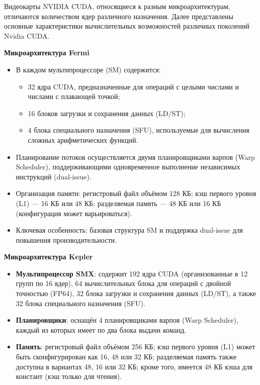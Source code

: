 \documentclass{article}[14pt]
\begin{document}
Видеокарты NVIDIA CUDA, относящиеся к разным микроархитектурам, отличаются количеством ядер различного назначения. 
Далее представлены основные характеристики вычислительных возможностей различных поколений Nvidia CUDA.

\noindent \textbf{Микроархитектура Fermi}

\begin{itemize}
\item В каждом мультипроцессоре (SM) содержится:
  \begin{itemize}
    \item 32 ядра CUDA, предназначенные для операций с целыми числами и числами с плавающей точкой;
    \item 16 блоков загрузки и сохранения данных (LD/ST);
    \item 4 блока специального назначения (SFU), используемые для вычисления сложных арифметических функций.
  \end{itemize}
\item Планирование потоков осуществляется двумя планировщиками варпов (Warp Scheduler), поддерживающими одновременное выполнение независимых инструкций (dual-issue).
\item Организация памяти: регистровый файл объёмом 128 КБ; кэш первого уровня (L1) — 16 КБ или 48 КБ; разделяемая память — 48 КБ или 16 КБ (конфигурация может варьироваться).
\item Ключевая особенность: базовая структура SM и поддержка dual-issue для повышения производительности.
\end{itemize}

\noindent \textbf{Микроархитектура Kepler}

\begin{itemize}
\item \textbf{Мультипроцессор SMX}: содержит 192 ядра CUDA (организованные в 12 групп по 16 ядер), 64 вычислительных блока для операций с 
двойной точностью (FP64), 32 блока загрузки и сохранения данных (LD/ST), а также 32 блока специального назначения (SFU).

\item \textbf{Планировщики}: оснащён 4 планировщиками варпов (Warp Scheduler), каждый из которых имеет по два блока выдачи команд.

\item \textbf{Память}: регистровый файл объёмом 256 КБ; кэш первого уровня (L1) может быть сконфигурирован как 16, 48 или 32 КБ; разделяемая 
память также доступна в вариантах 48, 16 или 32 КБ; кроме того, имеется 48 КБ кэша для констант (кэш только для чтения).
\end{itemize}
\end{document}
